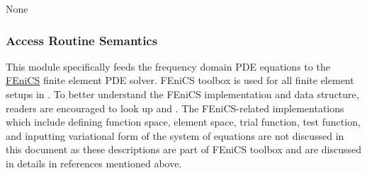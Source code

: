\documentclass[12pt, titlepage]{article}
\begin{document}
	None
	
	\subsubsection{Access Routine Semantics}
	
	This module specifically feeds the frequency domain PDE equations to the
	\hyperref{https://fenicsproject.org/}{}{}{FEniCS} finite element PDE solver.
	FEniCS toolbox is used for all finite element setups in \progname{}. To better
	understand the  FEniCS implementation and data structure, readers are encouraged
	to look up \cite{alnaes2015fenics} and \cite{logg2012finite}. The FEniCS-related
	implementations which include defining function space, element space, trial
	function, test function, and inputting variational form of the system of
	equations are not discussed in this document as these descriptions are part of
	FEniCS toolbox and are discussed in details in references mentioned above.
	
\end{document}
